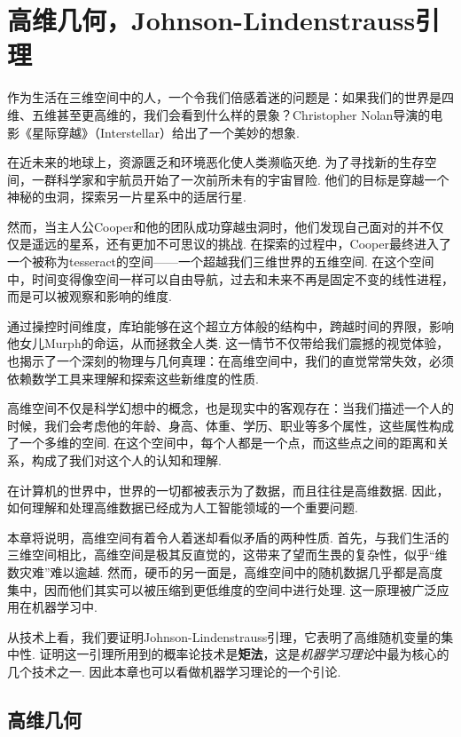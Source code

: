  \chapter{高维几何，Johnson-Lindenstrauss引理}\label{chap:J-L-Lemma}

作为生活在三维空间中的人，一个令我们倍感着迷的问题是：如果我们的世界是四维、五维甚至更高维的，我们会看到什么样的景象？Christopher Nolan导演的电影《星际穿越》（Interstellar）给出了一个美妙的想象. 

在近未来的地球上，资源匮乏和环境恶化使人类濒临灭绝. 为了寻找新的生存空间，一群科学家和宇航员开始了一次前所未有的宇宙冒险. 他们的目标是穿越一个神秘的虫洞，探索另一片星系中的适居行星. 

然而，当主人公Cooper和他的团队成功穿越虫洞时，他们发现自己面对的并不仅仅是遥远的星系，还有更加不可思议的挑战. 在探索的过程中，Cooper最终进入了一个被称为tesseract的空间——一个超越我们三维世界的五维空间. 在这个空间中，时间变得像空间一样可以自由导航，过去和未来不再是固定不变的线性进程，而是可以被观察和影响的维度. 

通过操控时间维度，库珀能够在这个超立方体般的结构中，跨越时间的界限，影响他女儿Murph的命运，从而拯救全人类. 这一情节不仅带给我们震撼的视觉体验，也揭示了一个深刻的物理与几何真理：在高维空间中，我们的直觉常常失效，必须依赖数学工具来理解和探索这些新维度的性质. 

高维空间不仅是科学幻想中的概念，也是现实中的客观存在：当我们描述一个人的时候，我们会考虑他的年龄、身高、体重、学历、职业等多个属性，这些属性构成了一个多维的空间. 在这个空间中，每个人都是一个点，而这些点之间的距离和关系，构成了我们对这个人的认知和理解. 

在计算机的世界中，世界的一切都被表示为了数据，而且往往是高维数据. 因此，如何理解和处理高维数据已经成为人工智能领域的一个重要问题. 

本章将说明，高维空间有着令人着迷却看似矛盾的两种性质. 首先，与我们生活的三维空间相比，高维空间是极其反直觉的，这带来了望而生畏的复杂性，似乎“维数灾难”难以逾越. 然而，硬币的另一面是，高维空间中的随机数据几乎都是高度集中，因而他们其实可以被压缩到更低维度的空间中进行处理. 这一原理被广泛应用在机器学习中. 

从技术上看，我们要证明Johnson-Lindenstrauss引理，它表明了高维随机变量的集中性. 证明这一引理所用到的概率论技术是\textbf{矩法}，这是\textit{机器学习理论}中最为核心的几个技术之一. 因此本章也可以看做机器学习理论的一个引论. 

\section{高维几何}

